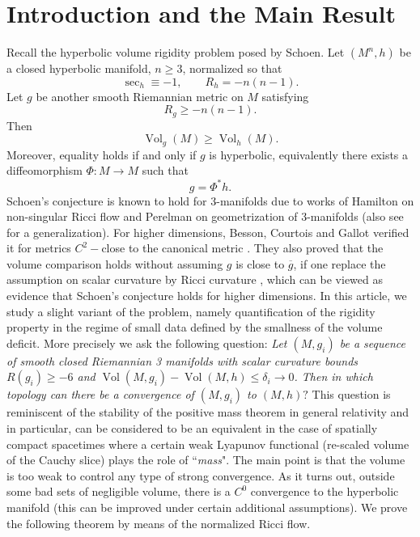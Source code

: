 \documentclass{amsart}
\begin{document}
\section{Introduction and the Main Result}
\noindent Recall the hyperbolic volume rigidity problem posed by Schoen. 
Let $(M^n,h)$ be a closed hyperbolic manifold, $n\geq 3$, normalized so that
\[
        \sec_h \equiv -1,
        \qquad
        R_h=-n(n-1).
\]
Let $g$ be another smooth Riemannian metric on $M$ satisfying
\[
        R_g \geq -n(n-1).
\]
Then
\[
        \operatorname{Vol}_g(M)\geq \operatorname{Vol}_h(M).
\]
Moreover, equality holds if and only if $g$ is hyperbolic, equivalently there exists a
diffeomorphism $\Phi:M\to M$ such that
\[
        g=\Phi^{*}h .
\]
Schoen’s conjecture is known to hold for 3-manifolds due to works of Hamilton on non-singular Ricci flow \cite{hamilton1999non} and Perelman on geometrization of 3-manifolds \cite{perelman2002entropy,perelman2003ricci} (also see
\cite{agol2007lower} for a generalization). For higher dimensions, Besson, Courtois and Gallot verified it for
metrics $C^{2}-$close to the canonical metric \cite{besson1991volume}. They also proved that the volume comparison
holds without assuming $g$ is close to $\overline{g}$, if one replace the assumption on scalar curvature by
Ricci curvature \cite{besson1995entropies}, which can be viewed as evidence that Schoen’s conjecture holds for
higher dimensions. In this article, we study a slight variant of the problem, namely quantification of the rigidity property in the regime of small data defined by the smallness of the volume deficit. More precisely we ask the following question: \textit{Let $(M,g_{i})$ be a sequence of smooth closed Riemannian 3 manifolds with scalar curvature bounds $R(g_{i})\geq -6$ and $\operatorname{Vol}(M,g_{i})-\operatorname{Vol}(M,h)\leq \delta_{i}\to 0$. Then in which topology can there be a convergence of $(M,g_{i})$ to $(M,h)?$} This question is reminiscent of the stability of the positive mass theorem in general relativity \cite{dong2025stability} and in particular, can be considered to be an equivalent in the case of spatially compact spacetimes where a certain weak Lyapunov functional (re-scaled volume of the Cauchy slice) plays the role of ``\textit{mass}". The main point is that the volume is too weak to control any type of strong convergence. As it turns out, outside some bad sets of negligible volume, there is a $C^{0}$ convergence to the hyperbolic manifold (this can be improved under certain additional assumptions). We prove the following theorem by means of the normalized Ricci flow.  
\end{document}
